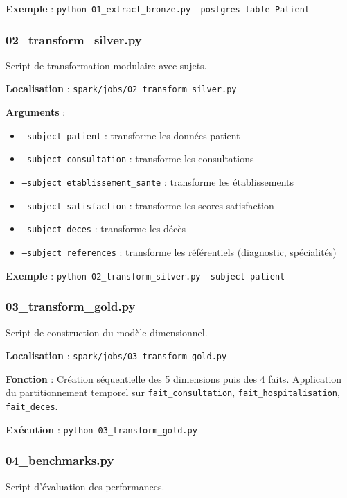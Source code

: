 \documentclass[12pt,a4paper]{article}
\begin{document}
\textbf{Exemple} : \texttt{python 01\_extract\_bronze.py --postgres-table Patient}

\subsubsection{02\_transform\_silver.py}

Script de transformation modulaire avec sujets.

\textbf{Localisation} : \texttt{spark/jobs/02\_transform\_silver.py}

\textbf{Arguments} :
\begin{itemize}
\item \texttt{--subject patient} : transforme les données patient
\item \texttt{--subject consultation} : transforme les consultations
\item \texttt{--subject etablissement\_sante} : transforme les établissements
\item \texttt{--subject satisfaction} : transforme les scores satisfaction
\item \texttt{--subject deces} : transforme les décès
\item \texttt{--subject references} : transforme les référentiels (diagnostic, spécialités)
\end{itemize}

\textbf{Exemple} : \texttt{python 02\_transform\_silver.py --subject patient}

\subsubsection{03\_transform\_gold.py}

Script de construction du modèle dimensionnel.

\textbf{Localisation} : \texttt{spark/jobs/03\_transform\_gold.py}

\textbf{Fonction} : Création séquentielle des 5 dimensions puis des 4 faits. Application du partitionnement temporel sur \texttt{fait\_consultation}, \texttt{fait\_hospitalisation}, \texttt{fait\_deces}.

\textbf{Exécution} : \texttt{python 03\_transform\_gold.py}

\subsubsection{04\_benchmarks.py}

Script d'évaluation des performances.
\end{document}
